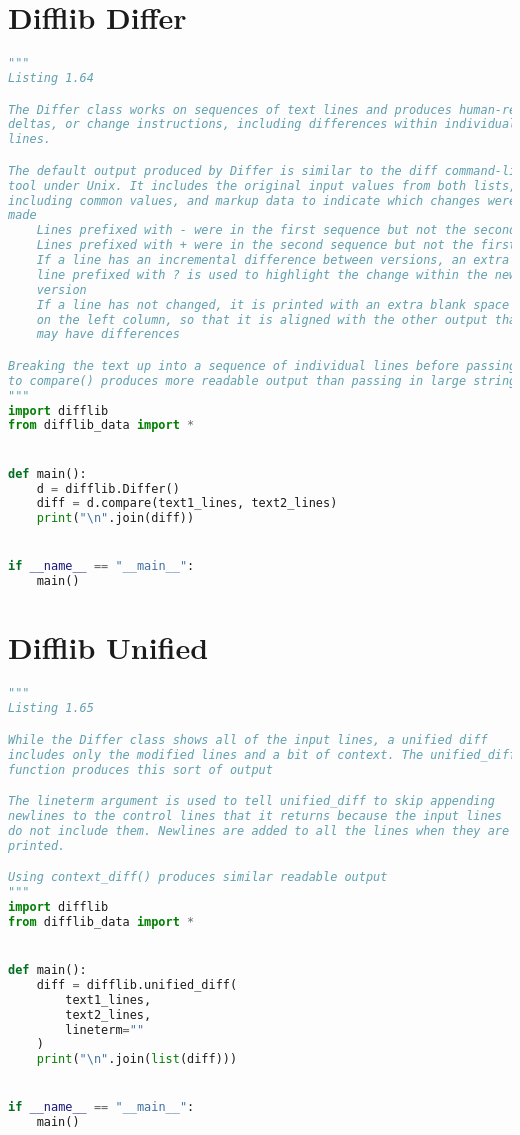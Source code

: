 \documentclass[a4paper,landscape]{report}
\begin{document}
\section{Difflib Differ}
\begin{lstlisting}[language=Python]
"""
Listing 1.64

The Differ class works on sequences of text lines and produces human-readable
deltas, or change instructions, including differences within individual
lines.

The default output produced by Differ is similar to the diff command-line
tool under Unix. It includes the original input values from both lists,
including common values, and markup data to indicate which changes were
made
    Lines prefixed with - were in the first sequence but not the second
    Lines prefixed with + were in the second sequence but not the first
    If a line has an incremental difference between versions, an extra
    line prefixed with ? is used to highlight the change within the new
    version
    If a line has not changed, it is printed with an extra blank space
    on the left column, so that it is aligned with the other output that
    may have differences

Breaking the text up into a sequence of individual lines before passing it
to compare() produces more readable output than passing in large strings
"""
import difflib
from difflib_data import *


def main():
    d = difflib.Differ()
    diff = d.compare(text1_lines, text2_lines)
    print("\n".join(diff))


if __name__ == "__main__":
    main()

\end{lstlisting}
\section{Difflib Unified}
\begin{lstlisting}[language=Python]
"""
Listing 1.65

While the Differ class shows all of the input lines, a unified diff
includes only the modified lines and a bit of context. The unified_diff()
function produces this sort of output

The lineterm argument is used to tell unified_diff to skip appending
newlines to the control lines that it returns because the input lines
do not include them. Newlines are added to all the lines when they are
printed.

Using context_diff() produces similar readable output
"""
import difflib
from difflib_data import *


def main():
    diff = difflib.unified_diff(
        text1_lines,
        text2_lines,
        lineterm=""
    )
    print("\n".join(list(diff)))


if __name__ == "__main__":
    main()

\end{lstlisting}
\end{document}
